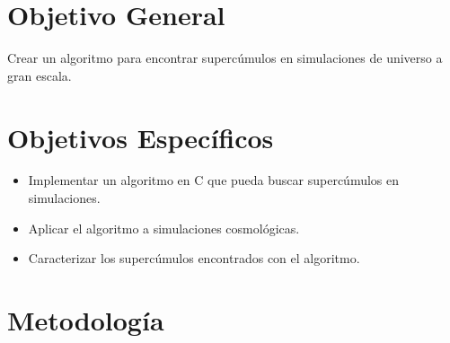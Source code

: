 \documentclass[12pt]{article}
\begin{document}
\section{Objetivo General}


Crear un algoritmo para encontrar supercúmulos en simulaciones de universo a gran escala.


\section{Objetivos Específicos}


\begin{itemize}
	\item Implementar un algoritmo en C que pueda buscar supercúmulos en simulaciones.
	\item Aplicar el algoritmo a simulaciones cosmológicas.
	\item Caracterizar los supercúmulos encontrados con el algoritmo.
\end{itemize}

\section{Metodología}

\end{document}
